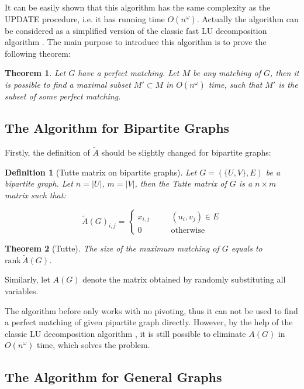 \documentclass{article}
\newtheorem*{definition}{Definition}
\newtheorem{theorem}{Theorem}
\begin{document}
			It can be easily shown that this algorithm has the same complexity as the UPDATE procedure, i.e. it has running time $O(n^\omega)$. Actually the algorithm can be considered as a simplified version of the classic fast LU decomposition algorithm  . The main purpose to introduce this algorithm is to prove the following theorem:

			\begin{theorem}
				Let $G$ have a perfect matching. Let $M$ be any matching of $G$, then it is possible to find a maximal subset $M' \subset M$ in $O(n^\omega)$ time, such that $M'$ is the subset of some perfect matching.
				\label{submatch}
			\end{theorem}
		
		\subsection{The Algorithm for Bipartite Graphs}
			
			Firstly, the definition of $\tilde A$ should be slightly changed for bipartite graphs:

			\begin{definition}[Tutte matrix on bipartite graphs]
				Let  $G=(\{U, V\},E)$ be a bipartite graph. Let $n = |U|$, $m = |V|$, then the Tutte matrix of $G$ is a $n \times m$ matrix such that:

				$$ \tilde A(G)_{i,j} = \left\{ \begin{aligned} x_{i,j} & \quad & (u_i, v_j)\in E \\ 0 & \quad & \text{otherwise}\end{aligned} \right. $$
			\end{definition}

			\begin{theorem}[Tutte]
				The size of the maximum matching of $G$ equals to $\mathrm{rank}\, \tilde A(G)$.
			\end{theorem}
			
			Similarly, let $A(G)$ denote the matrix obtained by randomly substituting all variables.

			The algorithm before only works with no pivoting, thus it can not be used to find a perfect matching of given pipartite graph directly. However, by the help of the classic LU decomposition algorithm  , it is still possible to eliminate $A(G)$ in $O(n^\omega)$ time, which solves the problem.
		
		\subsection{The Algorithm for General Graphs}
\end{document}
